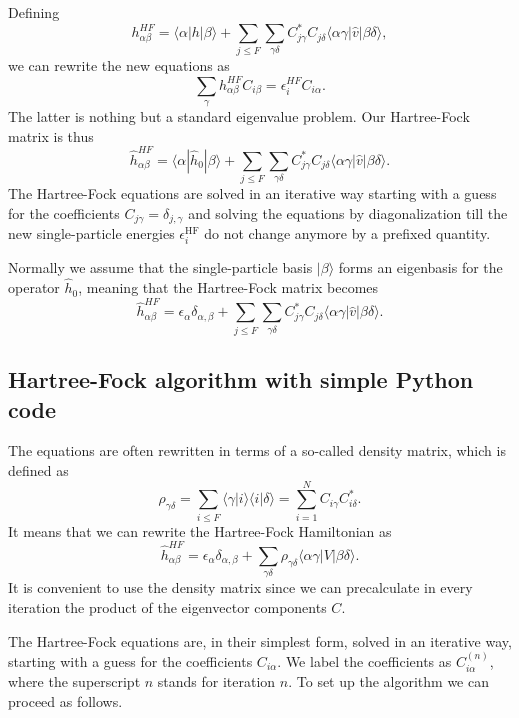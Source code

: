 Defining
\[
h_{\alpha\beta}^{HF}=\langle \alpha | h | \beta \rangle+
\sum_{j\le F}\sum_{\gamma\delta} C^*_{j\gamma}C_{j\delta}\langle
\alpha\gamma|\hat{v}|\beta\delta\rangle,
\]
we can rewrite the new equations as
\begin{equation}
\sum_{\gamma}h_{\alpha\beta}^{HF}C_{i\beta}=\epsilon_i^{HF}C_{i\alpha}. \label{eq:newhf}
\end{equation}
The latter is nothing but a standard eigenvalue problem.  Our
Hartree-Fock matrix is thus
\[
\hat{h}_{\alpha\beta}^{HF}=\langle \alpha | \hat{h}_0 | \beta \rangle+
\sum_{j\le F}\sum_{\gamma\delta} C^*_{j\gamma}C_{j\delta}\langle
\alpha\gamma|\hat{v}|\beta\delta\rangle.
\]
The Hartree-Fock equations are solved in an iterative way starting
with a guess for the coefficients $C_{j\gamma}=\delta_{j,\gamma}$ and
solving the equations by diagonalization till the new single-particle
energies $\epsilon_i^{\mathrm{HF}}$ do not change anymore by a
prefixed quantity.

Normally we assume that the single-particle basis $|\beta\rangle$
forms an eigenbasis for the operator $\hat{h}_0$, meaning that the
Hartree-Fock matrix becomes
\[
\hat{h}_{\alpha\beta}^{HF}=\epsilon_{\alpha}\delta_{\alpha,\beta}+
\sum_{j\le F}\sum_{\gamma\delta} C^*_{j\gamma}C_{j\delta}\langle
\alpha\gamma|\hat{v}|\beta\delta\rangle.
\]

\subsection{Hartree-Fock algorithm with simple Python code}

The equations are often rewritten in terms of a so-called density matrix,
which is defined as 
\begin{equation}
\rho_{\gamma\delta}=\sum_{i\le F}\langle\gamma|i\rangle\langle i|\delta\rangle = \sum_{i=1}^{N}C_{i\gamma}C^*_{i\delta}.
\end{equation}
It means that we can rewrite the Hartree-Fock Hamiltonian as
\[
\hat{h}_{\alpha\beta}^{HF}=\epsilon_{\alpha}\delta_{\alpha,\beta}+
\sum_{\gamma\delta} \rho_{\gamma\delta}\langle \alpha\gamma|V|\beta\delta\rangle.
\]
It is convenient to use the density matrix since we can precalculate in every iteration the product of the eigenvector components $C$. 

The Hartree-Fock equations are, in their simplest form, solved in an
iterative way, starting with a guess for the coefficients
$C_{i\alpha}$. We label the coefficients as $C_{i\alpha}^{(n)}$, where
the superscript $n$ stands for iteration $n$.  To set up the algorithm
we can proceed as follows.


